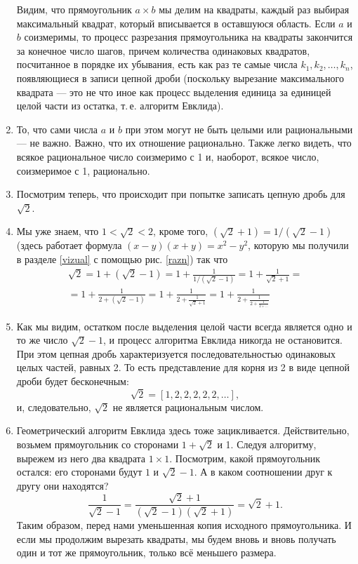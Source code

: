 \begin{enumerate}
Видим, что прямоугольник $a\times b$ мы делим на квадраты, каждый раз выбирая максимальный квадрат, который вписывается в оставшуюся область. Если $a$ и $b$ соизмеримы, то процесс разрезания прямоугольника на квадраты закончится за конечное число шагов, причем количества одинаковых квадратов, посчитанное в порядке их убывания, есть как раз те самые числа $k_1,k_2,\dots,k_n$, появляющиеся в записи цепной дроби (поскольку вырезание максимального квадрата --- это не что иное как процесс выделения единица за единицей целой части из остатка, т.\,е. алгоритм Евклида).
\item То, что сами числа $a$ и $b$ при этом могут не быть целыми или рациональными --- не важно. Важно, что их отношение рационально. Также легко видеть, что всякое рациональное число соизмеримо с 1 и, наоборот, всякое число, соизмеримое с 1, рационально.
\item Посмотрим теперь, что происходит при попытке записать цепную дробь для $\sqrt 2$.
\item Мы уже знаем, что $1<\sqrt 2<2$, кроме того, $(\sqrt 2+1)=1/(\sqrt 2-1)$ (здесь работает формула $(x-y)(x+y)=x^2-y^2$, которую мы получили в разделе \ref{vizual} с помощью рис. \ref{razn}) так что
\begin{multline*}
\sqrt 2 = \boxed{1} + (\sqrt 2-1) = \boxed{1} + \frac{1}{1/(\sqrt 2-1)} = 
\boxed{1} + \frac{1}{\sqrt 2+1} = \\ 
= \boxed{1} + \frac{1}{\boxed{2} + (\sqrt 2-1)} = 
\boxed{1} + \frac{1}{\boxed{2} + \frac{1}{\sqrt 2+1}} = 
\boxed{1} + \frac{1}{\boxed{2} + \frac{1}{\boxed{2} + \frac{1}{\boxed{2} + \dots}}}
\end{multline*}
\item Как мы видим, остатком после выделения целой части всегда является одно и то же число $\sqrt 2-1$, и процесс алгоритма Евклида никогда не остановится. При этом цепная дробь характеризуется последовательностью одинаковых целых частей, равных 2. То есть представление для корня из 2 в виде цепной дроби будет бесконечным:
$$
\sqrt 2 = [1,2,2,2,2,2,\dots],
$$
и, следовательно, $\sqrt 2$ не является рациональным числом.
\item Геометрический алгоритм Евклида здесь тоже зацикливается. Действительно, возьмем прямоугольник со сторонами $1+\sqrt 2$ и 1. Следуя алгоритму, вырежем из него два квадрата $1\times 1$. Посмотрим, какой прямоугольник остался: его сторонами будут $1$ и $\sqrt 2-1$. А в каком соотношении друг к другу они находятся?
$$
\frac{1}{\sqrt 2-1}=\frac{\sqrt{2}+1}{(\sqrt 2-1)(\sqrt 2+1)}=\sqrt 2+1.
$$
Таким образом, перед нами уменьшенная копия исходного прямоугольника. И если мы продолжим вырезать квадраты, мы будем вновь и вновь получать один и тот же прямоугольник, только всё меньшего размера.





\end{enumerate}
